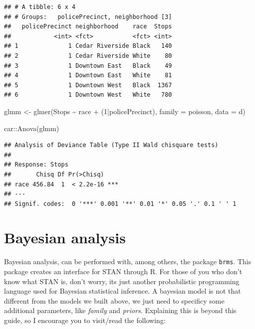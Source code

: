 \documentclass[
]{book}
\newenvironment{Shaded}{\begin{snugshade}}{\end{snugshade}}
\newcommand{\AttributeTok}[1]{\textcolor[rgb]{0.77,0.63,0.00}{#1}}
\newcommand{\DecValTok}[1]{\textcolor[rgb]{0.00,0.00,0.81}{#1}}
\newcommand{\FunctionTok}[1]{\textcolor[rgb]{0.00,0.00,0.00}{#1}}
\newcommand{\NormalTok}[1]{#1}
\newcommand{\OtherTok}[1]{\textcolor[rgb]{0.56,0.35,0.01}{#1}}
\newcommand{\SpecialCharTok}[1]{\textcolor[rgb]{0.00,0.00,0.00}{#1}}
\newcommand{\StringTok}[1]{\textcolor[rgb]{0.31,0.60,0.02}{#1}}
\begin{document}
\begin{verbatim}
## # A tibble: 6 x 4
## # Groups:   policePrecinct, neighborhood [3]
##   policePrecinct neighborhood    race  Stops
##            <int> <fct>           <fct> <int>
## 1              1 Cedar Riverside Black   140
## 2              1 Cedar Riverside White    80
## 3              1 Downtown East   Black    49
## 4              1 Downtown East   White    81
## 5              1 Downtown West   Black  1367
## 6              1 Downtown West   White   780
\end{verbatim}

\begin{Shaded}
\begin{Highlighting}[]
\NormalTok{glmm }\OtherTok{\textless{}{-}} \FunctionTok{glmer}\NormalTok{(Stops }\SpecialCharTok{\textasciitilde{}}\NormalTok{ race }\SpecialCharTok{+}\NormalTok{ (}\DecValTok{1}\SpecialCharTok{|}\NormalTok{policePrecinct),}
              \AttributeTok{family =} \StringTok{\textquotesingle{}poisson\textquotesingle{}}\NormalTok{, }\AttributeTok{data =}\NormalTok{ d)}

\NormalTok{car}\SpecialCharTok{::}\FunctionTok{Anova}\NormalTok{(glmm)}
\end{Highlighting}
\end{Shaded}

\begin{verbatim}
## Analysis of Deviance Table (Type II Wald chisquare tests)
## 
## Response: Stops
##       Chisq Df Pr(>Chisq)    
## race 456.84  1  < 2.2e-16 ***
## ---
## Signif. codes:  0 '***' 0.001 '**' 0.01 '*' 0.05 '.' 0.1 ' ' 1
\end{verbatim}

\hypertarget{bayesian-analysis}{%
\section{Bayesian analysis}\label{bayesian-analysis}}

Bayesian analysis, can be performed with, among others, the package \texttt{brms}.
This package creates an interface for STAN through R. For those of you who don't know what STAN is, don't worry, its just another probabilistic programming language used for Bayesian statistical inference.
A bayesian model is not that different from the models we built above, we just need to specificy some additional parameters, like \emph{family} and \emph{priors}. Explaining this is beyond this guide, so I encourage you to visit/read the following:
\end{document}
